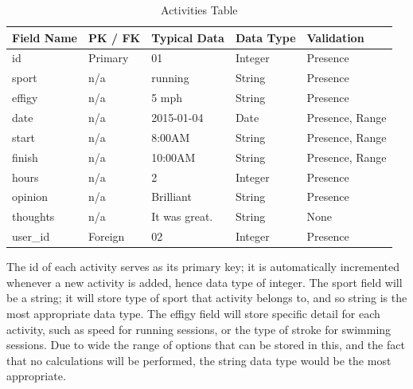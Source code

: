 \documentclass{article}[12pt,a4paper]
\begin{document}
\begin{table}[h]
\begin{tabular}{|l|l|l|l|l|}
\hline
\textbf{Field Name} & \textbf{PK / FK} & \textbf{Typical Data} & \textbf{Data Type} & \textbf{Validation} \\ \hline
id                  & Primary          & 01                    & Integer  & Presence                      \\ \hline
sport               & n/a              & running               & String   & Presence                      \\ \hline
effigy              & n/a              & 5 mph                 & String   & Presence                      \\ \hline
date                & n/a              & 2015-01-04            & Date     & Presence, Range               \\ \hline
start               & n/a              & 8:00AM                & String   & Presence, Range               \\ \hline
finish              & n/a              & 10:00AM               & String   & Presence, Range               \\ \hline
hours               & n/a              & 2                     & Integer  & Presence                      \\ \hline
opinion             & n/a              & Brilliant             & String   & Presence                      \\ \hline
thoughts            & n/a              & It was great.         & String   & None                          \\ \hline
user\_id            & Foreign          & 02                    & Integer  & Presence                      \\ \hline
\end{tabular}
\caption{Activities Table}
\end{table}

\noindent
The id of each activity serves as its primary key; it is automatically incremented whenever a new activity is added, hence data type of integer. The sport field will be a string; it will store type of sport that activity belongs to, and so string is the most appropriate data type. The effigy field will store specific detail for each activity, such as speed for running sessions, or the type of stroke for swimming sessions. Due to wide the range of options that can be stored in this, and the fact that no calculations will be performed, the string data type would be the most appropriate. 
\end{document}
